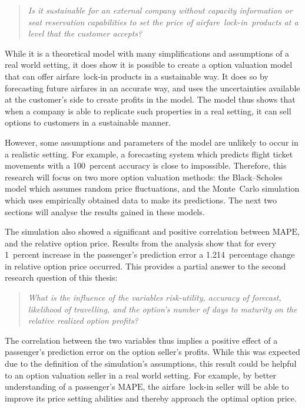 \begin{quote}\emph{Is it sustainable for an external company without capacity information or seat reservation capabilities to set the price of airfare~lock-in~products at a level that the customer accepts?}\end{quote}

While it is a theoretical model with many simplifications and assumptions of a real world setting, it does show it is possible to create a option valuation model that can offer airfare~lock-in products in a sustainable way. It does so by forecasting future airfares in an accurate way, and uses the uncertainties available at the customer's side to create profits in the model. The model thus shows that when a company is able to replicate such properties in a real setting, it can sell options to customers in a sustainable manner.

However, some assumptions and parameters of the model are unlikely to occur in a realistic setting. For example, a forecasting system which predicts flight ticket movements with a 100~percent accuracy is close to impossible. Therefore, this research will focus on two more option valuation methods: the Black--Scholes model which assumes random price fluctuations, and the Monte~Carlo simulation which uses empirically obtained data to make its predictions. The next two sections will analyse the results gained in these models.

The simulation also showed a significant and positive correlation between $\mbox{MAPE}$, and the relative option price. Results from the analysis show that for every 1~percent increase in the passenger's prediction error a 1.214~percentage change in relative option price occurred. This provides a partial answer to the second research question of this thesis:
\begin{quote}\emph{What is the influence of the variables risk-utility, accuracy of forecast, likelihood of travelling, and the option's number of days to maturity on the relative realized option profits?}\end{quote}

The correlation between the two variables thus implies a positive effect of a passenger's prediction error on the option seller's profits. While this was expected due to the definition of the simulation's assumptions, this result could be helpful to an option valuation seller in a real world setting. For example, by better understanding of a passenger's $\mbox{MAPE}$, the airfare~lock-in seller will be able to improve its price setting abilities and thereby approach the optimal option price.

